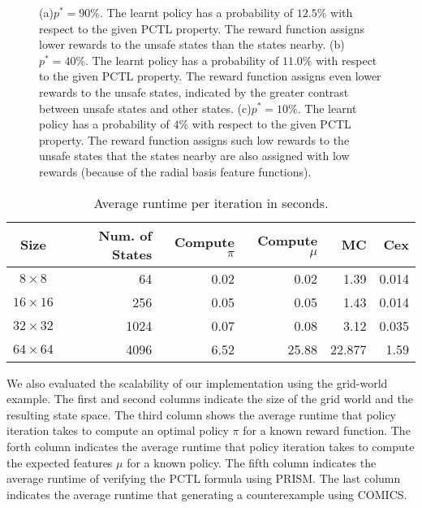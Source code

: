 {\begin{figure}[!htb]
\caption[Reward mappings of gridworld for different safety threshold]
{(a)$p^* = 90\%$. The learnt policy has a probability of $12.5\%$ with respect to the given PCTL property. The reward function assigns lower rewards to the unsafe states than the states nearby. (b) $p^* = 40\%$. The learnt policy has a probability of $11.0\%$ with respect to the given PCTL property. The reward function assigns even lower rewards to the unsafe states, indicated by the greater contrast between unsafe states and other states. (c)$p^* = 10\%$. The learnt policy has a probability of $4\%$ with respect to the given PCTL property. The reward function assigns such low rewards to the unsafe states that the states nearby are also assigned with low rewards (because of the radial basis feature functions).}
\label{fig:grid_world2}
\end{figure}
\begin{table}[htb]
\begin{center}
\caption{Average runtime per iteration in seconds.}
\begin{tabular}{|c|r|r|r|r|r|}
\hline
Size & Num. of States & Compute $\pi$ & Compute $\mu$ & MC & Cex\\
\hline
$8 \times 8$ & 64 & 0.02 & 0.02 & 1.39 & 0.014\\
$16 \times 16$ & 256 & 0.05 & 0.05 & 1.43  & 0.014\\
$32 \times 32$ & 1024 & 0.07 & 0.08 & 3.12 & 0.035\\
$64 \times 64$ & 4096 & 6.52 & 25.88 &  22.877  & 1.59\\
\hline
\end{tabular}
\label{tab:grid-world}
\end{center}
\end{table}
We also evaluated the scalability of our implementation using the grid-world example. The first and second columns indicate the size of the grid world and the resulting state space. The third column shows the average runtime that policy iteration takes to compute an optimal policy $\pi$ for a known reward function. The forth column indicates the average runtime that policy iteration takes to compute the expected features $\mu$ for a known policy. The fifth column indicates the average runtime of verifying the PCTL formula using PRISM. The last column indicates the average runtime that generating a counterexample using COMICS.  


}
